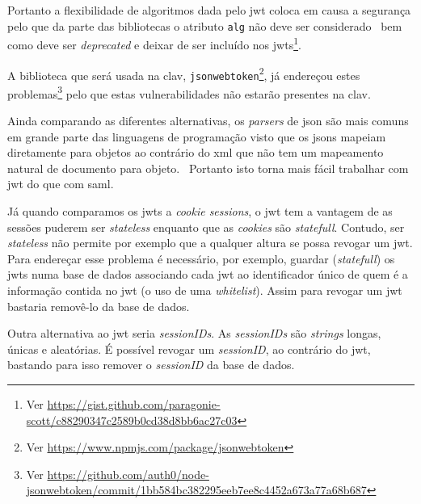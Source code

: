Portanto a flexibilidade de algoritmos dada pelo \acrshort{jwt} coloca em causa a segurança pelo que da parte das bibliotecas o atributo \texttt{alg} não deve ser considerado~\cite{jwtvuln} bem como deve ser \textit{deprecated} e deixar de ser incluído nos \acrshort{jwt}s\footnote{Ver \url{https://gist.github.com/paragonie-scott/c88290347c2589b0cd38d8bb6ac27c03}}. 

A biblioteca que será usada na \acrshort{clav}, \texttt{jsonwebtoken}\footnote{Ver \url{https://www.npmjs.com/package/jsonwebtoken}}, já endereçou estes problemas\footnote{Ver \url{https://github.com/auth0/node-jsonwebtoken/commit/1bb584bc382295eeb7ee8c4452a673a77a68b687}} pelo que estas vulnerabilidades não estarão presentes na \acrshort{clav}.

Ainda comparando as diferentes alternativas, os \textit{parsers} de \acrshort{json} são mais comuns em grande parte das linguagens de programação visto que os \acrshort{json}s mapeiam diretamente para objetos ao contrário do \acrshort{xml} que não tem um mapeamento natural de documento para objeto.~\cite{jwtio} Portanto isto torna mais fácil trabalhar com \acrshort{jwt} do que com \acrshort{saml}.

Já quando comparamos os \acrshort{jwt}s a \textit{cookie sessions}, o \acrshort{jwt} tem a vantagem de as sessões puderem ser \textit{stateless} enquanto que as \textit{cookies} são \textit{statefull}. Contudo, ser \textit{stateless} não permite por exemplo que a qualquer altura se possa revogar um \acrshort{jwt}. Para endereçar esse problema é necessário, por exemplo, guardar (\textit{statefull}) os \acrshort{jwt}s numa base de dados associando cada \acrshort{jwt} ao identificador único de quem é a informação contida no \acrshort{jwt} (o uso de uma \textit{whitelist}). Assim para revogar um \acrshort{jwt} bastaria removê-lo da base de dados.

Outra alternativa ao \acrshort{jwt} seria \textit{sessionIDs}. As \textit{sessionIDs} são \textit{strings} longas, únicas e aleatórias. É possível revogar um \textit{sessionID}, ao contrário do \acrshort{jwt}, bastando para isso remover o \textit{sessionID} da base de dados.

